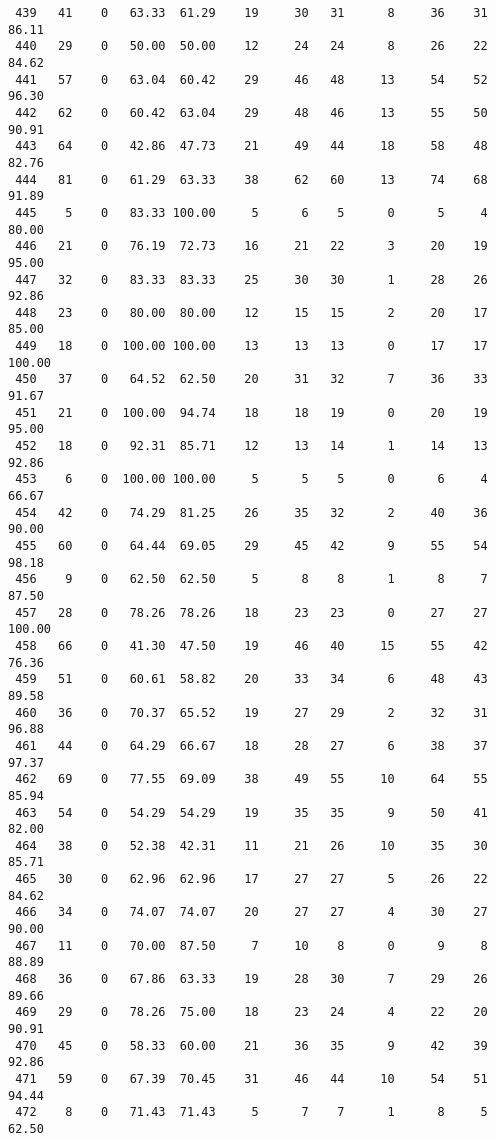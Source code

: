 \begin{verbatim}
 439   41    0   63.33  61.29    19     30   31      8     36    31    86.11
 440   29    0   50.00  50.00    12     24   24      8     26    22    84.62
 441   57    0   63.04  60.42    29     46   48     13     54    52    96.30
 442   62    0   60.42  63.04    29     48   46     13     55    50    90.91
 443   64    0   42.86  47.73    21     49   44     18     58    48    82.76
 444   81    0   61.29  63.33    38     62   60     13     74    68    91.89
 445    5    0   83.33 100.00     5      6    5      0      5     4    80.00
 446   21    0   76.19  72.73    16     21   22      3     20    19    95.00
 447   32    0   83.33  83.33    25     30   30      1     28    26    92.86
 448   23    0   80.00  80.00    12     15   15      2     20    17    85.00
 449   18    0  100.00 100.00    13     13   13      0     17    17   100.00
 450   37    0   64.52  62.50    20     31   32      7     36    33    91.67
 451   21    0  100.00  94.74    18     18   19      0     20    19    95.00
 452   18    0   92.31  85.71    12     13   14      1     14    13    92.86
 453    6    0  100.00 100.00     5      5    5      0      6     4    66.67
 454   42    0   74.29  81.25    26     35   32      2     40    36    90.00
 455   60    0   64.44  69.05    29     45   42      9     55    54    98.18
 456    9    0   62.50  62.50     5      8    8      1      8     7    87.50
 457   28    0   78.26  78.26    18     23   23      0     27    27   100.00
 458   66    0   41.30  47.50    19     46   40     15     55    42    76.36
 459   51    0   60.61  58.82    20     33   34      6     48    43    89.58
 460   36    0   70.37  65.52    19     27   29      2     32    31    96.88
 461   44    0   64.29  66.67    18     28   27      6     38    37    97.37
 462   69    0   77.55  69.09    38     49   55     10     64    55    85.94
 463   54    0   54.29  54.29    19     35   35      9     50    41    82.00
 464   38    0   52.38  42.31    11     21   26     10     35    30    85.71
 465   30    0   62.96  62.96    17     27   27      5     26    22    84.62
 466   34    0   74.07  74.07    20     27   27      4     30    27    90.00
 467   11    0   70.00  87.50     7     10    8      0      9     8    88.89
 468   36    0   67.86  63.33    19     28   30      7     29    26    89.66
 469   29    0   78.26  75.00    18     23   24      4     22    20    90.91
 470   45    0   58.33  60.00    21     36   35      9     42    39    92.86
 471   59    0   67.39  70.45    31     46   44     10     54    51    94.44
 472    8    0   71.43  71.43     5      7    7      1      8     5    62.50

\end{verbatim}
